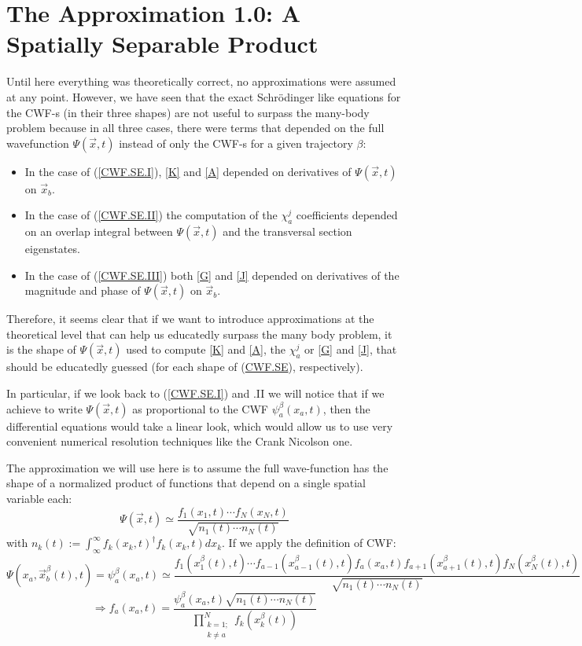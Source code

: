 \documentclass[11pt, a4paper]{article} %
\begin{document}
\newpage
\section{The Approximation 1.0: A Spatially Separable Product}

Until here everything was theoretically correct, no approximations were assumed at any point. However, we have seen that the exact Schrödinger like equations for the CWF-s (in their three shapes) are not useful to surpass the many-body problem because in all three cases, there were terms that depended on the full wavefunction $\Psi(\vec{x},t)$ instead of only the CWF-s for a given trajectory $\beta$:\vspace{-0.3cm}
\begin{itemize}
\item In the case of (\ref{CWF.SE.I}), \ref{K} and \ref{A} depended on derivatives of $\Psi(\vec{x},t)$ on $\vec{x}_b$.

\item In the case of (\ref{CWF.SE.II}) the computation of the $\chi^j_a$ coefficients depended on an overlap integral between $\Psi(\vec{x},t)$ and the transversal section eigenstates.

\item In the case of (\ref{CWF.SE.III}) both \ref{G} and \ref{J} depended on derivatives of the magnitude and phase of $\Psi(\vec{x},t)$ on $\vec{x}_b$. 
\end{itemize} 
\vspace{-0.3cm}
Therefore, it seems clear that if we want to introduce approximations at the theoretical level that can help us educatedly surpass the many body problem, it is the shape of $\Psi(\vec{x},t)$ used to compute \ref{K} and \ref{A}, the $\chi_a^j$ or \ref{G} and \ref{J}, that should be educatedly guessed (for each shape of (\hyperref[CWF.SE]{CWF.SE}), respectively).

In particular, if we look back to (\ref{CWF.SE.I}) and .II we will notice that if we achieve to write $\Psi(\vec{x},t)$ as proportional to the CWF $\psi_a^\beta(x_a,t)$, then the differential equations would take a linear look, which would allow us to use very convenient numerical resolution techniques like the Crank Nicolson one.

The approximation we will use here is to assume the full wave-function has the shape of a normalized product of functions that depend on a single spatial variable each:
$$
\Psi(\vec{x},t)\simeq \frac{f_1(x_1,t)\cdots f_N(x_N,t)}{\sqrt{n_1(t)\cdots n_N(t)}}
$$
with $n_k(t):=\int_{\infty}^\infty f_k(x_k,t)^\dagger f_k(x_k,t)dx_k$. If we apply the definition of CWF:
$$
\Psi(x_a, \vec{x}_b^\beta(t),t)=\psi_a^\beta(x_a,t)\simeq  \frac{f_1(x_1^\beta(t),t)\cdots f_{a-1}(x_{a-1}^\beta(t),t)f_{a}(x_a,t)f_{a+1}(x_{a+1}^\beta(t),t)f_N(x_N^\beta(t),t)}{\sqrt{n_1(t)\cdots n_N(t)}}
$$
$$
\Longrightarrow f_a(x_a,t)=\frac{\psi_a^\beta(x_a,t) \sqrt{n_1(t)\cdots n_N(t)}}{\prod_{\substack{k=1; \\ k\neq a}}^{N} f_k(x_k^\beta(t))}
$$
\end{document}
